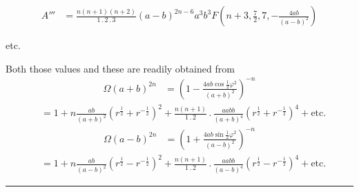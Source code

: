 \[
\begin{array}{rl}
A'''&=\frac{n(n+1)(n+2)}{1\mathbin{.}2\mathbin{.}3}(a-b)^{2n-6}a^3b^3F(n+3,\frac72,7,-\frac{4ab}{(a-b)^2})
\end{array}
\]
\begin{center}etc.\end{center}
Both those values and these are readily obtained from
\[
\begin{array}{rl}
\Omega(a+b)^{2n}&=(1-\frac{4ab\cos\frac12\varphi^2}{(a+b)^2})^{-n}
\end{array}
\]
\[
\begin{array}{rl}
&=1+n\frac{ab}{(a+b)^2}(r^{\frac12}+r^{-\frac12})^2+\frac{n(n+1)}{1\mathbin{.}2}\mathbin{.}\frac{aabb}{(a+b)^4}(r^{\frac12}+r^{-\frac12})^4+\mathrm{etc.}
\end{array}
\]
\[
\begin{array}{rl}
\Omega(a-b)^{2n}&=(1+\frac{4ab\sin\frac12\varphi^2}{(a-b)^2})^{-n}
\end{array}
\]
\[
\begin{array}{rl}
&=1+n\frac{ab}{(a-b)^2}(r^{\frac12}-r^{-\frac12})^2+\frac{n(n+1)}{1\mathbin{.}2}\mathbin{.}\frac{aabb}{(a-b)^4}(r^{\frac12}-r^{-\frac12})^4+\mathrm{etc.}
\end{array}
\]
\begin{center}\rule{.23\linewidth}{.4pt}\end{center}
